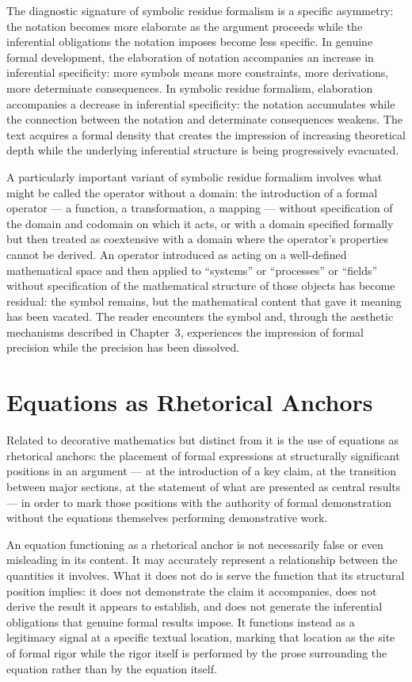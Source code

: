 \documentclass[12pt, openright, twoside]{book}
\begin{document}
The diagnostic signature of symbolic residue formalism is a
specific asymmetry: the notation becomes more elaborate as the
argument proceeds while the inferential obligations the notation
imposes become less specific. In genuine formal development,
the elaboration of notation accompanies an increase in inferential
specificity: more symbols means more constraints, more derivations,
more determinate consequences. In symbolic residue formalism,
elaboration accompanies a decrease in inferential specificity:
the notation accumulates while the connection between the notation
and determinate consequences weakens. The text acquires a formal
density that creates the impression of increasing theoretical
depth while the underlying inferential structure is being
progressively evacuated.

A particularly important variant of symbolic residue formalism
involves what might be called the operator without a domain:
the introduction of a formal operator --- a function, a
transformation, a mapping --- without specification of the
domain and codomain on which it acts, or with a domain specified
formally but then treated as coextensive with a domain where
the operator's properties cannot be derived. An operator
introduced as acting on a well-defined mathematical space and
then applied to ``systems'' or ``processes'' or ``fields''
without specification of the mathematical structure of those
objects has become residual: the symbol remains, but the
mathematical content that gave it meaning has been vacated.
The reader encounters the symbol and, through the aesthetic
mechanisms described in Chapter~3, experiences the impression
of formal precision while the precision has been dissolved.

\section{Equations as Rhetorical Anchors}

Related to decorative mathematics but distinct from it is the
use of equations as rhetorical anchors: the placement of formal
expressions at structurally significant positions in an argument
--- at the introduction of a key claim, at the transition between
major sections, at the statement of what are presented as central
results --- in order to mark those positions with the authority
of formal demonstration without the equations themselves
performing demonstrative work.

An equation functioning as a rhetorical anchor is not necessarily
false or even misleading in its content. It may accurately represent
a relationship between the quantities it involves. What it does
not do is serve the function that its structural position implies:
it does not demonstrate the claim it accompanies, does not derive
the result it appears to establish, and does not generate the
inferential obligations that genuine formal results impose. It
functions instead as a legitimacy signal at a specific textual
location, marking that location as the site of formal rigor
while the rigor itself is performed by the prose surrounding
the equation rather than by the equation itself.
\end{document}
